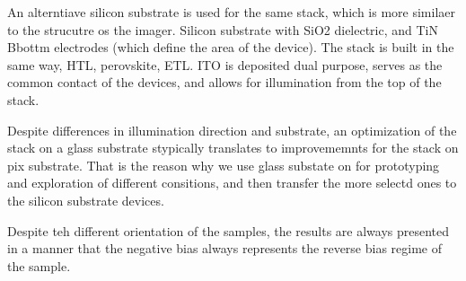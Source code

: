 An alterntiave silicon substrate is used for the same stack, which is more similaer to the strucutre os the imager. Silicon substrate with SiO2 dielectric, and TiN Bbottm electrodes (which define the area of the device). The stack is built in the same way, HTL, perovskite, ETL. ITO is deposited dual purpose, serves as the common contact of the devices, and allows for illumination from the top of the stack.

Despite differences in illumination direction and substrate, an optimization of the stack on a glass substrate stypically translates to improvememnts for the stack on pix substrate. That is the reason why we use glass substate on for prototyping and exploration of different consitions, and then transfer the more selectd ones to the silicon substrate devices. 

Despite teh different orientation of the samples, the results are always presented in a manner that the negative bias always represents the reverse bias regime of the sample. 

